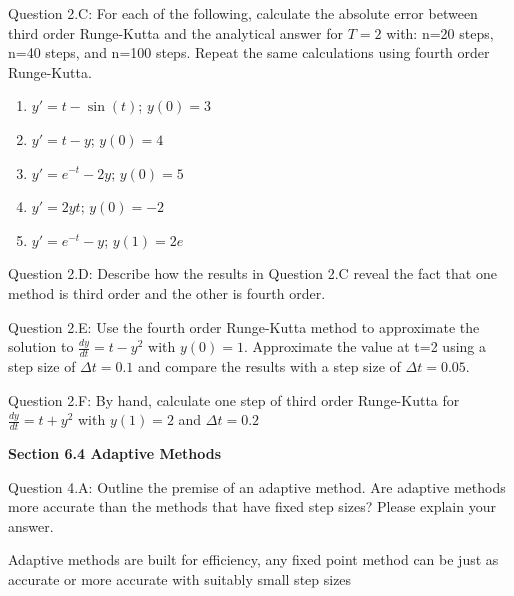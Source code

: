 \documentclass{article}
\def\ds{\displaystyle}
\begin{document}
 \medskip \par \noindent
%
Question 2.C:   For each of the following, calculate the absolute error between third order Runge-Kutta and the analytical answer for $T=2$ with: n=20 steps, n=40 steps, and n=100 steps. Repeat the same calculations using fourth order Runge-Kutta. 
\par
\begin{enumerate}[label=\alph*)]
    \item $\ds y' =t-\sin(t)$; \hspace{0.3in} $y(0)=3$
    \item $\ds y' =t-y$; \hspace{0.4in}  $y(0)=4$
    \item $\ds y' =e^{-t}-2y$; \hspace{0.2in}  $y(0)=5$
    \item $\ds y' =2yt$; \hspace{0.5in}  $y(0)=-2$
    \item $\ds y' =e^{-t}-y$; \hspace{0.3in}  $y(1)=2e$
\end{enumerate}
\medskip \par \noindent
%
Question 2.D:  Describe how the results in Question 2.C reveal the fact that one method is third order and the other is fourth order. 
\medskip \par \noindent
%
Question 2.E: Use the fourth order Runge-Kutta method to approximate the solution to $\ds \frac {dy}{dt}=t-y^2$ with $y(0)=1$. Approximate the value at t=2 using a step size of $\ds \Delta t=0.1$ and compare the results with a step size of $\ds \Delta t=0.05$. 
\medskip \par \noindent
%
Question 2.F: By hand, calculate one step of third order Runge-Kutta for $\ds \frac{dy}{dt} = t+y^2$ with $y(1)=2$ and $\ds \Delta t=0.2$

\par \bigskip \par
{\bf Section 6.4 Adaptive Methods} \\ 
\par \medskip \noindent
%
Question 4.A: Outline the premise of an adaptive method. Are adaptive methods more accurate than the methods that have fixed step sizes? Please explain your answer. 

{\color{teal} Adaptive methods are built for efficiency, any fixed point method can be just as accurate or more accurate with suitably small step sizes}
\end{document}
